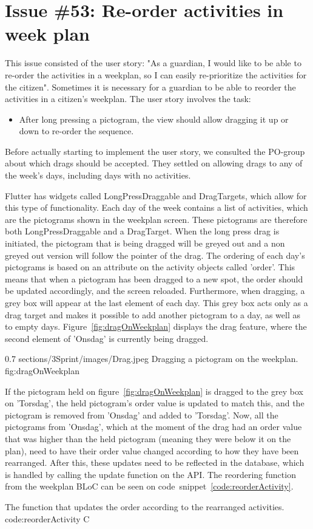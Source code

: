 \section{Issue \#53: Re-order activities in week plan}
This issue consisted of the user story: "As a guardian, I would like to be able to re-order the activities in a weekplan, so I can easily re-prioritize the activities for the citizen". Sometimes it is necessary for a guardian to be able to reorder the activities in a citizen's weekplan. The user story involves the task:
\begin{itemize}
    \item After long pressing a pictogram, the view should allow dragging it up or down to re-order the sequence.
\end{itemize}
Before actually starting to implement the user story, we consulted the PO-group about which drags should be accepted. They settled on allowing drags to any of the week's days, including days with no activities.

Flutter has widgets called LongPressDraggable and DragTargets, which allow for this type of functionality.
Each day of the week contains a list of activities, which are the pictograms shown in the weekplan screen. These pictograms are therefore both LongPressDraggable and a DragTarget.
When the long press drag is initiated, the pictogram that is being dragged will be greyed out and a non greyed out version will follow the pointer of the drag. The ordering of each day's pictograms is based on an attribute on the activity objects called 'order'. This means that when a pictogram has been dragged to a new spot, the order should be updated accordingly, and the screen reloaded. Furthermore, when dragging, a grey box will appear at the last element of each day. This grey box acts only as a drag target and makes it possible to add another pictogram to a day, as well as to empty days.
Figure~\ref{fig:dragOnWeekplan} displays the drag feature, where the second element of 'Onsdag' is currently being dragged.


        {0.7} %
        {sections/3Sprint/images/Drag.jpeg} %
        {Dragging a pictogram on the weekplan.} %
        {fig:dragOnWeekplan} %

If the pictogram held on figure~\ref{fig:dragOnWeekplan} is dragged to the grey box on 'Torsdag', the held pictogram's order value is updated to match this, and the pictogram is removed from 'Onsdag' and added to 'Torsdag'. Now, all the pictograms from 'Onsdag', which at the moment of the drag had an order value that was higher than the held pictogram (meaning they were below it on the plan), need to have their order value changed according to how they have been rearranged.
After this, these updates need to be reflected in the database, which is handled by calling the update function on the API.
The reordering function from the weekplan BLoC can be seen on code~snippet~\ref{code:reorderActivity}.

        {The function that updates the order according to the rearranged activities.} %
        {code:reorderActivity} %
        {C} %